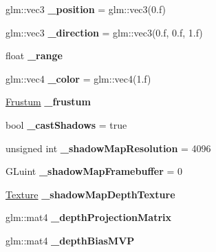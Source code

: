 \begin{DoxyCompactItemize}
\item 
\hypertarget{class_light_ada9f418a6e3ab83806b9851956652d88}{glm\+::vec3 {\bfseries \+\_\+position} = glm\+::vec3(0.f)}\label{class_light_ada9f418a6e3ab83806b9851956652d88}

\item 
\hypertarget{class_light_aa6926e51bbb4185f7a4fe762215be877}{glm\+::vec3 {\bfseries \+\_\+direction} = glm\+::vec3(0.f, 0.f, 1.f)}\label{class_light_aa6926e51bbb4185f7a4fe762215be877}

\item 
\hypertarget{class_light_ad945d96eedca98e242b101b21bd2a8fc}{float {\bfseries \+\_\+range}}\label{class_light_ad945d96eedca98e242b101b21bd2a8fc}

\item 
\hypertarget{class_light_a7304a2765a5ccee487edef48041e6b2d}{glm\+::vec4 {\bfseries \+\_\+color} = glm\+::vec4(1.f)}\label{class_light_a7304a2765a5ccee487edef48041e6b2d}

\item 
\hypertarget{class_light_a898b7f4cee73c29894f2d1a26a170f48}{\hyperlink{class_frustum}{Frustum} {\bfseries \+\_\+frustum}}\label{class_light_a898b7f4cee73c29894f2d1a26a170f48}

\item 
\hypertarget{class_light_a6c324048008d9af8b1194f597c5fb755}{bool {\bfseries \+\_\+cast\+Shadows} = true}\label{class_light_a6c324048008d9af8b1194f597c5fb755}

\item 
\hypertarget{class_light_a311fcb523c9a0599cd898af1809e75f8}{unsigned int {\bfseries \+\_\+shadow\+Map\+Resolution} = 4096}\label{class_light_a311fcb523c9a0599cd898af1809e75f8}

\item 
\hypertarget{class_light_a2fb15f0412438f5a343bdb1557791689}{G\+Luint {\bfseries \+\_\+shadow\+Map\+Framebuffer} = 0}\label{class_light_a2fb15f0412438f5a343bdb1557791689}

\item 
\hypertarget{class_light_ae59a04ed9a1f1878bce9bfc0fa918f7e}{\hyperlink{class_texture}{Texture} {\bfseries \+\_\+shadow\+Map\+Depth\+Texture}}\label{class_light_ae59a04ed9a1f1878bce9bfc0fa918f7e}

\item 
\hypertarget{class_light_a1e5ea113e051058b583a4a97d0db42d2}{glm\+::mat4 {\bfseries \+\_\+depth\+Projection\+Matrix}}\label{class_light_a1e5ea113e051058b583a4a97d0db42d2}

\item 
\hypertarget{class_light_abc2190bf4f06b675021cfe25f1a8a38e}{glm\+::mat4 {\bfseries \+\_\+depth\+Bias\+M\+V\+P}}\label{class_light_abc2190bf4f06b675021cfe25f1a8a38e}

\end{DoxyCompactItemize}
